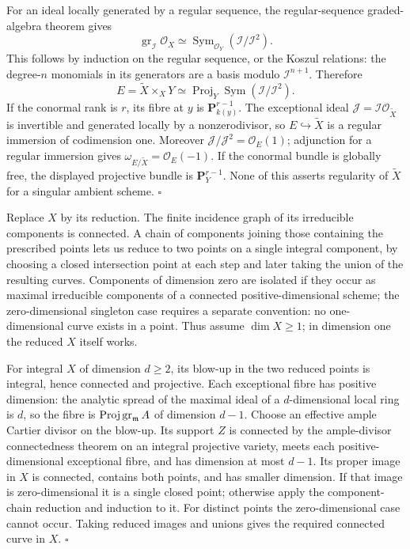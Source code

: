 \documentclass[11pt]{article}
\let\chapterexercise\exercise
\renewcommand{\exercise}[2]{\Needspace{8\baselineskip}\chapterexercise{#1}{#2}}
\begin{document}
\pf
For an ideal locally generated by a regular sequence, the regular-sequence graded-algebra theorem gives
\[ \operatorname{gr}_{\mathcal I}\mathcal O_X\simeq
\operatorname{Sym}_{\mathcal O_Y}(\mathcal I/\mathcal I^2). \]
This follows by induction on the regular sequence, or the Koszul relations: the degree-$n$ monomials in its generators are a basis modulo $\mathcal I^{n+1}$. Therefore
\[ E=\widetilde X\times_XY\simeq\operatorname{Proj}_Y\operatorname{Sym}(\mathcal I/\mathcal I^2). \]
If the conormal rank is $r$, its fibre at $y$ is $\mathbf P^{r-1}_{k(y)}$. The exceptional ideal $\mathcal J=\mathcal I\mathcal O_{\widetilde X}$ is invertible and generated locally by a nonzerodivisor, so $E\hookrightarrow\widetilde X$ is a regular immersion of codimension one. Moreover $\mathcal J/\mathcal J^2=\mathcal O_E(1)$; adjunction for a regular immersion gives $\omega_{E/\widetilde X}=\mathcal O_E(-1)$. If the conormal bundle is globally free, the displayed projective bundle is $\mathbf P^{r-1}_Y$. None of this asserts regularity of $\widetilde X$ for a singular ambient scheme. \hfill$\square$

\pf
Replace $X$ by its reduction. The finite incidence graph of its irreducible components is connected. A chain of components joining those containing the prescribed points lets us reduce to two points on a single integral component, by choosing a closed intersection point at each step and later taking the union of the resulting curves. Components of dimension zero are isolated if they occur as maximal irreducible components of a connected positive-dimensional scheme; the zero-dimensional singleton case requires a separate convention: no one-dimensional curve exists in a point. Thus assume $\dim X\ge1$; in dimension one the reduced $X$ itself works.

For integral $X$ of dimension $d\ge2$, its blow-up in the two reduced points is integral, hence connected and projective. Each exceptional fibre has positive dimension: the analytic spread of the maximal ideal of a $d$-dimensional local ring is $d$, so the fibre is $\operatorname{Proj}\operatorname{gr}_{\mathfrak m}A$ of dimension $d-1$. Choose an effective ample Cartier divisor on the blow-up. Its support $Z$ is connected by the ample-divisor connectedness theorem on an integral projective variety, meets each positive-dimensional exceptional fibre, and has dimension at most $d-1$. Its proper image in $X$ is connected, contains both points, and has smaller dimension. If that image is zero-dimensional it is a single closed point; otherwise apply the component-chain reduction and induction to it. For distinct points the zero-dimensional case cannot occur. Taking reduced images and unions gives the required connected curve in $X$. \hfill$\square$
\end{document}

